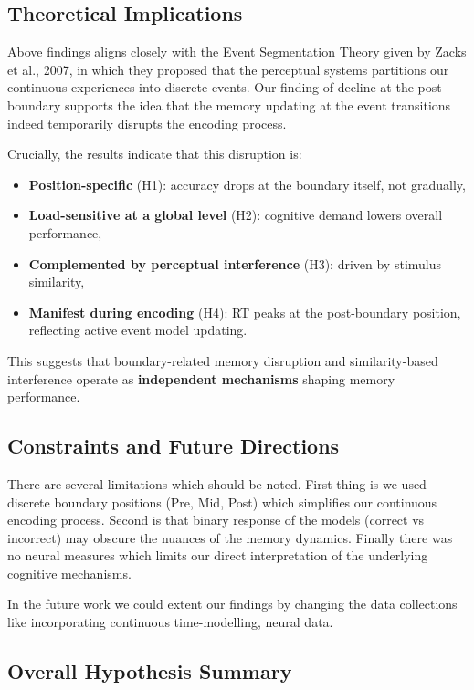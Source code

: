 \documentclass[
  12pt,
]{article}
\begin{document}
\subsection{Theoretical Implications}

Above findings aligns closely with the Event Segmentation Theory given by Zacks et al., 2007, in which they proposed that the perceptual systems partitions our continuous experiences into discrete events. Our finding of decline at the post-boundary supports the idea that the memory updating at the event transitions indeed temporarily disrupts the encoding process.

Crucially, the results indicate that this disruption is:
\begin{itemize}
\item \textbf{Position-specific} (H1): accuracy drops at the boundary itself, not gradually,
\item \textbf{Load-sensitive at a global level} (H2): cognitive demand lowers overall performance,
\item \textbf{Complemented by perceptual interference} (H3): driven by stimulus similarity,
\item \textbf{Manifest during encoding} (H4): RT peaks at the post-boundary position, reflecting active event model updating.
\end{itemize}

This suggests that boundary-related memory disruption and similarity-based interference operate as \textbf{independent mechanisms} shaping memory performance.

\subsection{Constraints and Future Directions}

There are several limitations which should be noted. First thing is we used discrete boundary positions (Pre, Mid, Post) which simplifies our continuous encoding process. Second is that binary response of the models (correct vs incorrect) may obscure the nuances of the memory dynamics. Finally there was no neural measures which limits our direct interpretation of the underlying cognitive mechanisms. 

In the future work we could extent our findings by changing the data collections like incorporating continuous time-modelling, neural data.

\subsection{Overall Hypothesis Summary}
\end{document}
